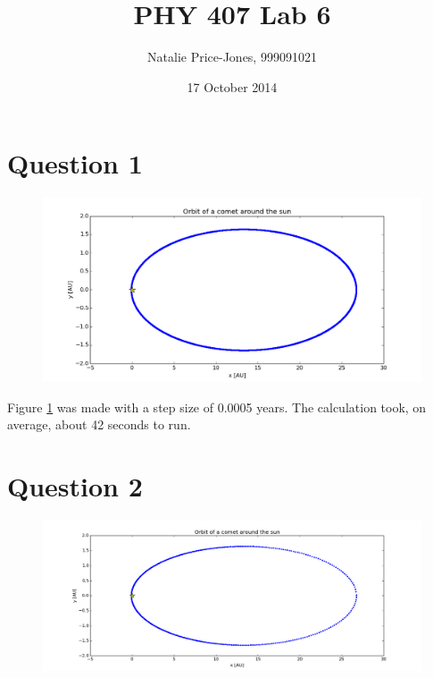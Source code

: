 \documentclass[a4paper,12pt]{article}
\begin{document}
\onehalfspacing
\title{PHY 407 Lab 6}
\author{Natalie Price-Jones, 999091021}
\date{17 October 2014}
\maketitle

\section{Question 1}

\begin{figure}[H]
\centering
\includegraphics[width = \linewidth]{lab6q1.png}
\caption{}
\label{fig:q1}
\end{figure}
 
Figure \ref{fig:q1} was made with a step size of 0.0005 years. The calculation took, on average, about 42 seconds to run.

\section{Question 2}

\begin{figure}[H]
\centering
\includegraphics[width = \linewidth]{lab6q2.png}
\caption{}
\label{fig:q2}
\end{figure}
\end{document}
